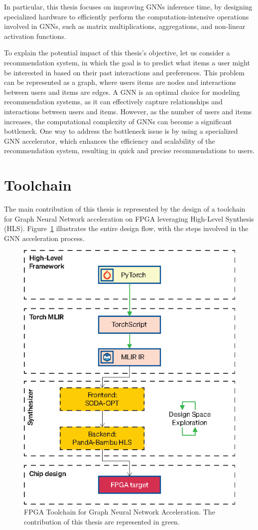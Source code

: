 \documentclass[11pt,a4paper,twocolumn]{article}
\begin{document}
In particular, this thesis focuses on improving GNNs inference time, by designing specialized hardware to efficiently perform the computation-intensive operations involved in GNNs, such as matrix multiplications, aggregations, and non-linear activation functions.

To explain the potential impact of this thesis's objective, let us consider a recommendation system, in which the goal is to predict what items a user might be interested in based on their past interactions and preferences.
This problem can be represented as a graph, where users items are nodes and interactions between users and items are edges.
A GNN is an optimal choice for modeling recommendation systems, as it can effectively capture relationships and interactions between users and items.
However, as the number of users and items increases, the computational complexity of GNNs can become a significant bottleneck.
One way to address the bottleneck issue is by using a specialized GNN accelerator, which enhances the efficiency and scalability of the recommendation system, resulting in quick and precise recommendations to users.


\section{Toolchain}
\label{sec:toolchain}%

The main contribution of this thesis is represented by the design of a toolchain for Graph Neural Network acceleration on FPGA leveraging High-Level Synthesis (HLS).
Figure~\ref{fig:toolchain} illustrates the entire design flow, with the steps involved in the GNN acceleration process.

\begin{figure}[t]
    \centering
    \includegraphics[height=0.4\textwidth]{Images/toolchain}
    \caption{FPGA Toolchain for Graph Neural Network Acceleration. The contribution of this thesis are represented in green.}
    \label{fig:toolchain}
\end{figure}
\end{document}
